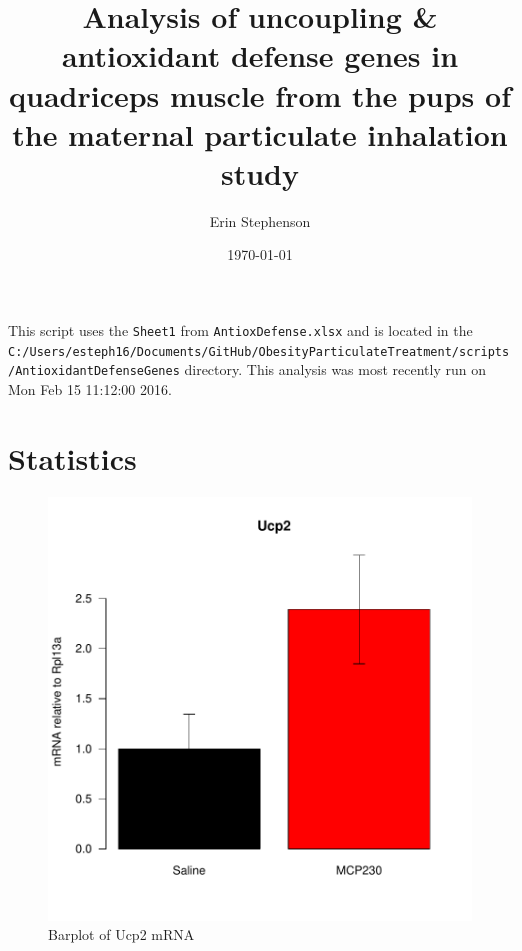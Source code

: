 \documentclass{article}
\begin{document}


\title{Analysis of uncoupling & antioxidant defense genes in quadriceps muscle from the pups of the maternal particulate inhalation study}
\author{Erin Stephenson}
\date{\today}
\maketitle

This script uses the \verb+Sheet1+ from \verb+AntioxDefense.xlsx+ and is located in the \verb+C:/Users/esteph16/Documents/GitHub/ObesityParticulateTreatment/scripts/AntioxidantDefenseGenes+ directory.  This analysis was most recently run on Mon Feb 15 11:12:00 2016.  

\section*{Statistics}
\begin{figure}
\begin{center}
\includegraphics{MaternalParticulateAntioxDefense-barplotUcp2}
\end{center}
\caption{Barplot of Ucp2 mRNA}
\label{fig:barplotUcp2}
\end{figure}
\end{document}

